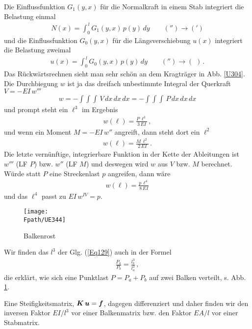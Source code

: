Die Einflussfunktion $G_1(y,x)$ f\"{u}r die Normalkraft in einem Stab integriert die Belastung einmal
\begin{align}
N(x) = \int_0^{\,l} G_1(y,x)\,p(y)\,dy \qquad ('') \to (')
\end{align}
und die Einflussfunktion $G_0(y,x)$ f\"{u}r die L\"{a}ngsverschiebung $u(x) $ integriert die Belastung zweimal
\begin{align}
u(x) = \int_0^{\,l} G_0(y,x)\,p(y)\,dy \qquad ('') \to (\,\,)\,.
\end{align}
Das R\"{u}ckw\"{a}rtsrechnen sieht man sehr sch\"{o}n an dem Kragtr\"{a}ger in Abb. \ref{U304}. Die Durchbiegung $w$ ist ja das dreifach unbestimmte Integral der Querkraft $V = - EI\,w'''$
\begin{align}
w = -\int\! \int\! \int\, V\,dx\,dx\,dx = - \int\! \int\! \int\, P\,dx\,dx\,dx
\end{align}
und prompt steht ein $\ell^3$ im Ergebnis
\begin{align}\label{Eq129}
w(\ell) = \frac{P\,\ell^3}{3\,EI}\,,
\end{align}
und wenn ein Moment $M = - EI\,w''$ angreift, dann steht dort ein  $\ell^2$
\begin{align}
w(\ell) = \frac{M\,\ell^2}{2\,EI}\,.
\end{align}
Die letzte \glq vern\"{u}nftige\grq{}, integrierbare Funktion in der Kette der Ableitungen ist $w'''$ (LF $P$) bzw. $w''$ (LF $M$) und deswegen wird $w$  aus $V$ bzw. $M$ berechnet. W\"{u}rde statt $P$ eine Streckenlast $p$ angreifen, dann w\"{a}re
\begin{align}
w(\ell) = \frac{p\,\ell^4}{8\,EI}
\end{align}
und das $\ell^4$ passt zu $ EI\,w^{IV} = p$.

\begin{figure}[tbp]
\centering
\if {} \sidecaption \fi
\texttt{[image: \\Fpath/UE344]}
\caption{Balkenrost} \label{UE344}
\end{figure}%

Wir finden das $l^3$ der Glg. (\ref{Eq129}) auch in der Formel
\begin{align}
\frac{P_a}{P_b} = \frac{l_b^3}{l_a^3}\,,
\end{align}
die erkl\"{a}rt, wie sich eine Punktlast $P = P_a + P_b$ auf zwei Balken verteilt, s. Abb. \ref{UE344}.

Eine Steifigkeitsmatrix, $\mbox{\boldmath $K$}\,\mbox{\boldmath $u$} = \mbox{\boldmath $f$}$, dagegen differenziert und daher finden wir den \glq inversen\grq{} Faktor $EI/l^3$ vor einer Balkenmatrix bzw. den Faktor $EA/l$ vor einer Stabmatrix.

